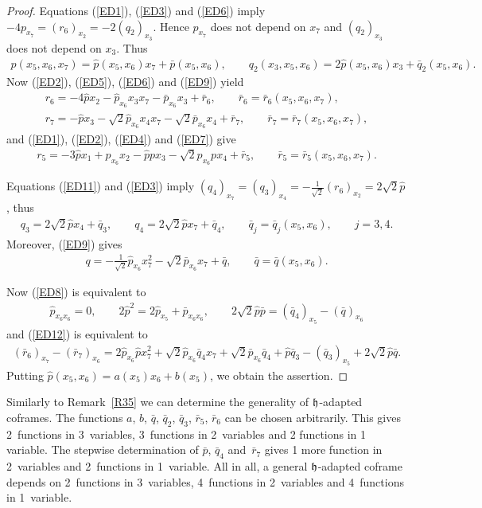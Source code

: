\documentclass[pdftex]{sigma}
\numberwithin{equation}{section}
\newcommand\fh{{\frak h}}
\begin{document}
\begin{proof}
Equations (\ref{ED1}), (\ref{ED3}) and (\ref{ED6}) imply $-4 p_{x_7}=(r_6)_{x_2}=-2(q_2)_{x_3}$. Hence $p_{x_7}$ does not depend on $x_7$ and $(q_2)_{x_3}$ does not depend on $x_3$. Thus
\begin{gather*}p(x_5,x_6,x_7)=\hat p(x_5,x_6)x_7+\bar p(x_5,x_6), \qquad q_2(x_3,x_5,x_6)=2\hat p(x_5,x_6)x_3 +\bar q_2(x_5,x_6).\end{gather*}
Now (\ref{ED2}), (\ref{ED5}), (\ref{ED6}) and (\ref{ED9}) yield
\begin{gather*}
r_6 = -4 \hat px_2-\hat p_{x_6} x_3 x_7 -\bar p_{x_6} x_3 +\bar r_6,\qquad \bar r_6=\bar r_6(x_5,x_6,x_7),\\
r_7 = -\hat p x_3-\sqrt 2 \hat p_{x_6} x_4x_7-\sqrt 2\bar p_{x_6} x_4 +\bar r_7, \qquad \bar r_7=\bar r_7(x_5,x_6,x_7),
\end{gather*}
and (\ref{ED1}), (\ref{ED2}), (\ref{ED4}) and (\ref{ED7}) give
\begin{gather*} r_5= -3\hat p x_1+p_{x_6}x_2-\hat ppx_3-\sqrt2 p_{x_6}px_4+\bar r_5,\qquad \bar r_5=\bar r_5(x_5,x_6,x_7).\end{gather*}

Equations (\ref{ED11}) and (\ref{ED3}) imply
 $(q_4)_{x_7}=(q_3)_{x_4}=-\frac 1{\sqrt2} (r_6)_{x_2}=2\sqrt 2 \hat p$, thus
\begin{gather*} q_3=2\sqrt 2 \hat px_4+\bar q_3,\qquad q_4=2\sqrt 2 \hat p x_7 +\bar q_4, \qquad \bar q_j=\bar q_j(x_5,x_6),\qquad j=3,4 .\end{gather*}
Moreover, (\ref{ED9}) gives
\begin{gather*}q= -\tfrac1{\sqrt 2} \hat p_{x_6} x_7^2-\sqrt 2 \bar p_{x_6}x_7+\bar q,\qquad \bar q=\bar q(x_5,x_6). \end{gather*}

Now (\ref{ED8}) is equivalent to
\begin{gather*}\hat p_{x_6 x_6}=0,\qquad 2\hat p^2=2\hat p_{x_5}+\bar p_{x_6 x_6}, \qquad
2\sqrt 2\hat p\bar p=(\bar q_4)_{x_5}-(\bar q)_{x_6}\end{gather*}
and (\ref{ED12}) is equivalent to
\begin{gather*}(\bar r_6)_{x_7}-(\bar r_7)_{x_6}=2\hat p_{x_6}\hat px_7^2+\sqrt2\hat p_{x_6}\bar q_4x_7+\sqrt2 \bar p_{x_6} \bar q_4+\hat p\bar q_3-(\bar q_3)_{x_5}+2\sqrt2 \hat p\bar q.\end{gather*}
Putting $\hat p(x_5,x_6)=a(x_5)x_6+b(x_5)$, we obtain the assertion.
\end{proof}
\begin{Remark}\label{R38} Similarly to Remark~\ref{R35} we can determine the generality of $\fh$-adapted coframes. The functions $a$, $b$, $\bar q$, $\bar q_2$, $\bar q_3$, $\bar r_5$, $\bar r_6 $ can be chosen arbitrarily. This gives 2~functions in 3~variables, 3~functions in 2~variables and 2 functions in 1 variable. The stepwise determination of $\bar p$, $\bar q_4$ and~$\bar r_7$ gives 1 more function in 2~variables and 2~functions in 1~variable. All in all, a general $\fh$-adapted coframe depends on 2~functions in 3~variables, 4~functions in 2~variables and 4~functions in 1~variable.
\end{Remark}
\end{document}
